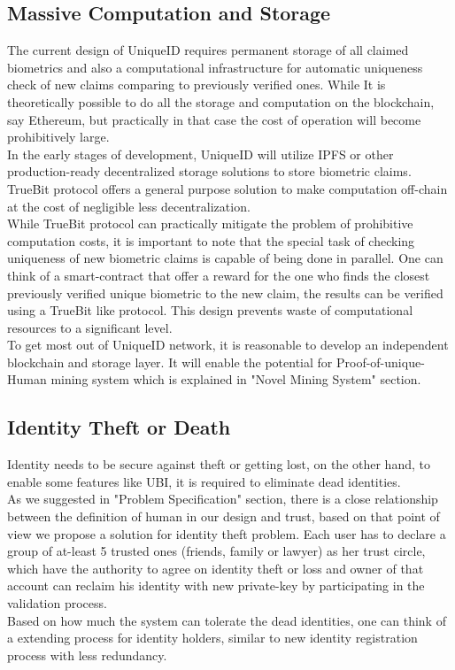 \documentclass{article}
\begin{document}
\subsection{Massive Computation and Storage}
The current design of UniqueID requires permanent storage of all claimed biometrics and also a computational infrastructure for automatic uniqueness check of new claims comparing to previously verified ones. While It is theoretically possible to do all the storage and computation on the blockchain, say Ethereum, but practically in that case the cost of operation will become prohibitively large. \\
In the early stages of development, UniqueID will utilize IPFS or other production-ready decentralized storage solutions to store biometric claims. TrueBit protocol offers a general purpose solution to make computation off-chain at the cost of negligible less decentralization. \\
While TrueBit protocol can practically mitigate the problem of prohibitive computation costs, it is important to note that the special task of checking uniqueness of new biometric claims is capable of being done in parallel. One can think of a smart-contract that offer a reward for the one who finds the closest previously verified unique biometric to the new claim, the results can be verified using a TrueBit like protocol. This design prevents waste of computational resources to a significant level.\\
To get most out of UniqueID network, it is reasonable to develop an independent blockchain and storage layer. It will enable the potential for Proof-of-unique-Human mining system which is explained in "Novel Mining System" section. 
\subsection{Identity Theft or Death}
Identity needs to be secure against theft or getting lost, on the other hand, to enable some features like UBI, it is required to eliminate dead identities.\\
As we suggested in "Problem Specification" section, there is a close relationship between the definition of human in our design and trust, based on that point of view we propose a solution for identity theft problem. Each user has to declare a group of at-least 5 trusted ones (friends, family or lawyer) as her trust circle, which have the authority to agree on identity theft or loss and owner of that account can reclaim his identity with new private-key by participating in the validation process.\\
Based on how much the system can tolerate the dead identities, one can think of a extending process for identity holders, similar to new identity registration process with less redundancy.
\end{document}
